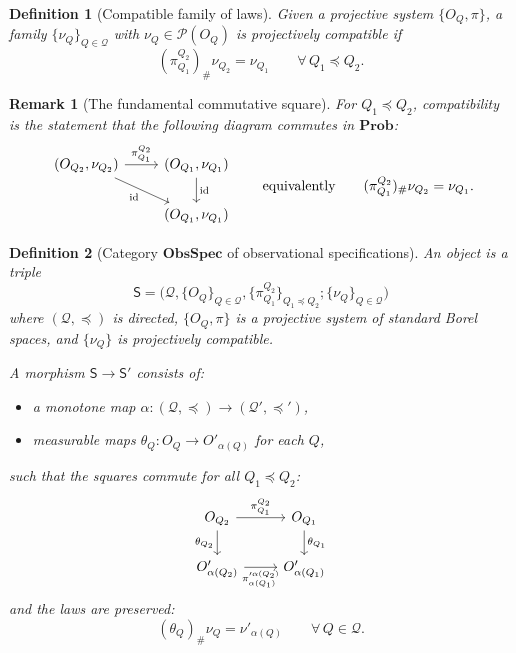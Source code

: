 \documentclass[11pt]{article}
\newtheorem{definition}{Definition}
\newtheorem{remark}{Remark}
\begin{document}
\begin{definition}[Compatible family of laws]
Given a projective system $\{O_Q,\pi\}$, a family $\{\nu_Q\}_{Q\in\mathcal Q}$ with
$\nu_Q\in\mathcal P(O_Q)$ is \emph{projectively compatible} if
\[
(\pi^{Q_2}_{Q_1})_\#\nu_{Q_2}=\nu_{Q_1}\qquad\forall\, Q_1\preceq Q_2.
\]
\end{definition}

\begin{remark}[The fundamental commutative square]
For $Q_1\preceq Q_2$, compatibility is the statement that the following diagram
commutes in $\mathbf{Prob}$:
\[
\begin{tikzcd}
(O_{Q_2},\nu_{Q_2}) \arrow[r,"\pi^{Q_2}_{Q_1}"] \arrow[dr,swap,"\mathrm{id}"]
& (O_{Q_1},\nu_{Q_1}) \arrow[d,"\mathrm{id}"] \\
& (O_{Q_1},\nu_{Q_1})
\end{tikzcd}
\qquad\text{equivalently}\qquad
(\pi^{Q_2}_{Q_1})_\#\nu_{Q_2}=\nu_{Q_1}.
\]
\end{remark}


\begin{definition}[Category $\mathbf{ObsSpec}$ of observational specifications]
An object is a triple
\[
\mathsf S = \big(\mathcal Q,\{O_Q\}_{Q\in\mathcal Q},\{\pi^{Q_2}_{Q_1}\}_{Q_1\preceq Q_2};\{\nu_Q\}_{Q\in\mathcal Q}\big)
\]
where $(\mathcal Q,\preceq)$ is directed, $\{O_Q,\pi\}$ is a projective system of standard Borel
spaces, and $\{\nu_Q\}$ is projectively compatible.

A morphism $\mathsf S\to \mathsf S'$ consists of:
\begin{itemize}
\item a monotone map $\alpha:(\mathcal Q,\preceq)\to (\mathcal Q',\preceq')$,
\item measurable maps $\theta_Q:O_Q\to O'_{\alpha(Q)}$ for each $Q$,
\end{itemize}
such that the squares commute for all $Q_1\preceq Q_2$:
\[
\begin{tikzcd}
O_{Q_2} \arrow[r,"\pi^{Q_2}_{Q_1}"] \arrow[d,"\theta_{Q_2}"']
& O_{Q_1} \arrow[d,"\theta_{Q_1}"] \\
O'_{\alpha(Q_2)} \arrow[r,"\pi'^{\alpha(Q_2)}_{\alpha(Q_1)}"']
& O'_{\alpha(Q_1)}
\end{tikzcd}
\]
and the laws are preserved:
\[
(\theta_Q)_\#\nu_Q = \nu'_{\alpha(Q)}\qquad\forall\,Q\in\mathcal Q.
\]
\end{definition}
\end{document}
